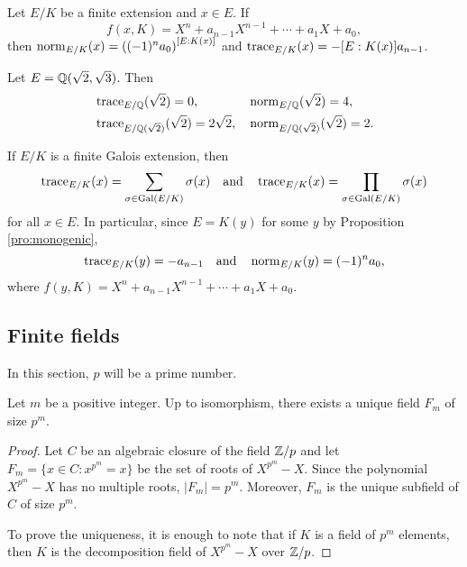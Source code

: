 \begin{exercise}
        Let $E/K$ be a finite extension and
        $x\in E$. If
        \[
        f(x,K)=X^n+a_{n-1}X^{n-1}+\cdots+a_1X+a_0,
        \]
        then 
        $\operatorname{norm}_{E/K}(x)=\left((-1)^na_0\right)^{[E:K(x)]}$ and 
        $\operatorname{trace}_{E/K}(x)=-[E:K(x)]a_{n-1}$. 
\end{exercise}

\begin{example}
    Let $E=\mathbb{Q}(\sqrt{2},\sqrt{3})$. Then 
    \begin{align*}
    &\operatorname{trace}_{E/\mathbb{Q}}(\sqrt{2})=0,
    &&
    \operatorname{norm}_{E/\mathbb{Q}}(\sqrt{2})=4,\\
    &\operatorname{trace}_{E/\mathbb{Q}(\sqrt{2})}(\sqrt{2})=2\sqrt{2},
    &&\operatorname{norm}_{E/\mathbb{Q}(\sqrt{2})}(\sqrt{2})=2.    
    \end{align*}
\end{example}

\begin{example}
    If $E/K$ is a finite Galois extension, then 
    \[
    \operatorname{trace}_{E/K}(x)=\sum_{\sigma\in\operatorname{Gal}(E/K)}\sigma(x)
    \quad\text{and}\quad
    \operatorname{trace}_{E/K}(x)=\prod_{\sigma\in\operatorname{Gal}(E/K)}\sigma(x)
    \]
    for all $x\in E$. In particular, since $E=K(y)$ for some
    $y$ by Proposition \ref{pro:monogenic}, 
    \[
    \operatorname{trace}_{E/K}(y)=-a_{n-1}
    \quad\text{and}\quad
    \operatorname{norm}_{E/K}(y)=(-1)^na_0,
    \]
    where
    $f(y,K)=X^n+a_{n-1}X^{n-1}+\cdots+a_1X+a_0$.
\end{example}        

\subsection{Finite fields}

In this section, $p$ will be a prime number. 

\begin{proposition}
    Let $m$ be a positive integer. 
    Up to isomorphism, there exists a unique 
    field $F_m$ of size $p^m$. 
\end{proposition}

\begin{proof}
    Let $C$ be an algebraic closure of the field $\mathbb{Z}/p$ and 
    let $F_m=\{x\in C:x^{p^m}=x\}$ be the set of roots of $X^{p^m}-X$. Since 
    the polynomial $X^{p^m}-X$ has no multiple roots, $|F_m|=p^m$. Moreover, 
    $F_m$ is the unique subfield of $C$ of size $p^m$. 
    
    To prove the uniqueness, it is enough to note that 
    if $K$ is a field of $p^m$ elements, then
    $K$ is the decomposition field of $X^{p^m}-X$ over $\mathbb{Z}/p$.  
\end{proof}

